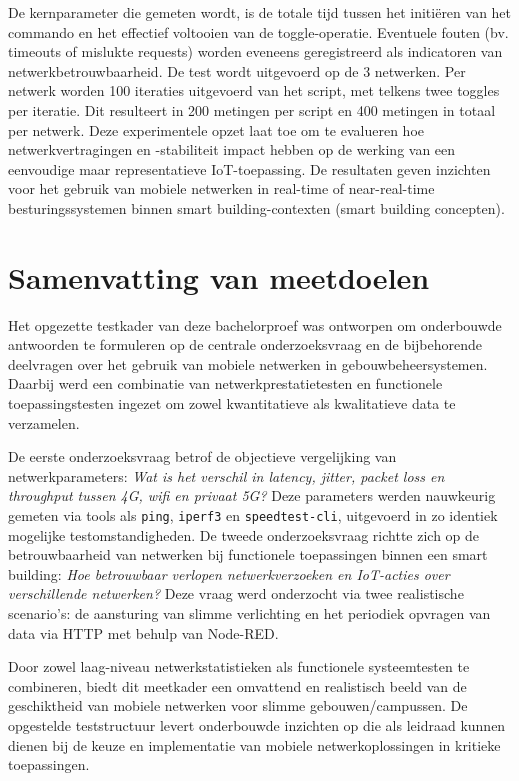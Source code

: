 De kernparameter die gemeten wordt, is de totale tijd tussen het initiëren van het commando en het effectief voltooien van de toggle-operatie. Eventuele fouten (bv. timeouts of mislukte requests) worden eveneens geregistreerd als indicatoren van netwerkbetrouwbaarheid.
De test wordt uitgevoerd op de 3 netwerken. Per netwerk worden 100 iteraties uitgevoerd van het script, met telkens twee toggles per iteratie. Dit resulteert in 200 metingen per script en 400 metingen in totaal per netwerk.
Deze experimentele opzet laat toe om te evalueren hoe netwerkvertragingen en -stabiliteit impact hebben op de werking van een eenvoudige maar representatieve IoT-toepassing. De resultaten geven inzichten voor het gebruik van mobiele netwerken in real-time of near-real-time besturingssystemen binnen smart building-contexten (smart building concepten).



\section{Samenvatting van meetdoelen}

Het opgezette testkader van deze bachelorproef was ontworpen om onderbouwde antwoorden te formuleren op de centrale onderzoeksvraag en de bijbehorende deelvragen over het gebruik van mobiele netwerken in gebouwbeheersystemen. Daarbij werd een combinatie van netwerkprestatietesten en functionele toepassingstesten ingezet om zowel kwantitatieve als kwalitatieve data te verzamelen.

De eerste onderzoeksvraag betrof de objectieve vergelijking van netwerkparameters: \textit{Wat is het verschil in latency, jitter, packet loss en throughput tussen 4G, wifi en privaat 5G?} Deze parameters werden nauwkeurig gemeten via tools als \texttt{ping}, \texttt{iperf3} en \texttt{speedtest-cli}, uitgevoerd in zo identiek mogelijke testomstandigheden. De tweede onderzoeksvraag richtte zich op de betrouwbaarheid van netwerken bij functionele toepassingen binnen een smart building: \textit{Hoe betrouwbaar verlopen netwerkverzoeken en IoT-acties over verschillende netwerken?} Deze vraag werd onderzocht via twee realistische scenario’s: de aansturing van slimme verlichting en het periodiek opvragen van data via HTTP met behulp van Node-RED.

Door zowel laag-niveau netwerkstatistieken als functionele systeemtesten te combineren, biedt dit meetkader een omvattend en realistisch beeld van de geschiktheid van mobiele netwerken voor slimme gebouwen/campussen. De opgestelde teststructuur levert onderbouwde inzichten op die als leidraad kunnen dienen bij de keuze en implementatie van mobiele netwerkoplossingen in kritieke toepassingen.

